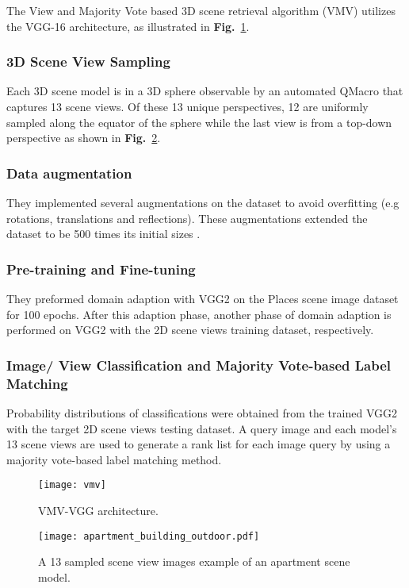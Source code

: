 \documentclass[../main.tex]{subfiles}
\begin{document}
	
The View and Majority Vote based 3D scene retrieval algorithm (VMV) utilizes the VGG-16 architecture, as illustrated in \textbf{Fig.}~\ref{SHREC19}. 

\subsubsection{3D Scene View Sampling}
Each 3D scene model is in a 3D sphere observable by an automated QMacro that captures 13 scene views. Of these 13 unique perspectives, 12 are uniformly sampled along the equator of the sphere while the last view is from a top-down perspective as shown in \textbf{Fig.}~\ref{apartment_building_outdoor}.


\subsubsection{Data augmentation}
They implemented several augmentations on the dataset to avoid overfitting (e.g rotations, translations and reflections). These augmentations extended the dataset to be 500 times its initial sizes \cite{3DICPR}. 


\subsubsection{Pre-training and Fine-tuning}   
They preformed domain adaption with VGG2 on the Places scene image dataset \cite{zhou2017places} for 100 epochs. After this adaption phase, another phase of domain adaption is performed on VGG2 with the 2D scene views training dataset, respectively.

\subsubsection{Image/ View Classification and Majority Vote-based Label Matching}
Probability distributions of classifications were obtained from the trained VGG2 with the target 2D scene views testing dataset. A query image and each model's 13 scene views are used to generate a rank list for each image query by using a majority vote-based label matching method.

\begin{figure}[!htp]
\centering
{
\texttt{[image: vmv]}
}
\caption{VMV-VGG architecture.}
\label{SHREC19}
\end{figure}

\begin{figure}[!htp]
\centering
{
\texttt{[image: apartment\_building\_outdoor.pdf]}
}
\caption{A 13 sampled scene view images example of an apartment scene model.}
\label{apartment_building_outdoor}
\end{figure}
\end{document}
